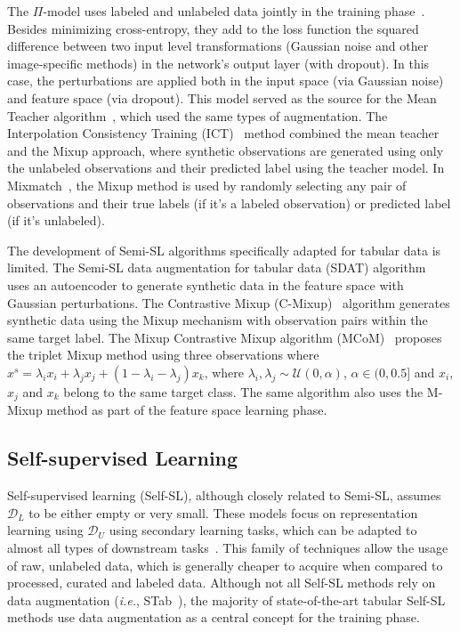\documentclass[parskip=full]{scrartcl}
\begin{document}
The $\Pi$-model uses labeled and unlabeled data jointly in the training
phase~\cite{samuli2017temporal}. Besides minimizing cross-entropy, they add to
the loss function the squared difference between two input level
transformations (Gaussian noise and other image-specific methods) in the
network's output layer (with dropout). In this case, the perturbations are
applied both in the input space (via Gaussian noise) and feature space (via
dropout). This model served as the source for the Mean Teacher
algorithm~\cite{tarvainen2017mean}, which used the same types of augmentation.
The Interpolation Consistency Training (ICT)~\cite{verma2022interpolation}
method combined the mean teacher and the Mixup approach, where synthetic
observations are generated using only the unlabeled observations and their
predicted label using the teacher model. In
Mixmatch~\cite{berthelot2019mixmatch}, the Mixup method is used by randomly
selecting any pair of observations and their true labels (if it's a labeled
observation) or predicted label (if it's unlabeled).

The development of Semi-SL algorithms specifically adapted for tabular data is
limited. The Semi-SL data augmentation for tabular data (SDAT)
algorithm~\cite{fang2022semi} uses an autoencoder to generate synthetic data
in the feature space with Gaussian perturbations. The Contrastive Mixup
(C-Mixup)~\cite{darabi2021contrastive} algorithm generates synthetic data
using the Mixup mechanism with observation pairs within the same target label.
The Mixup Contrastive Mixup algorithm (MCoM)~\cite{li2022mcom} proposes the triplet Mixup
method using three observations where $x^s = \lambda_ix_i + \lambda_jx_j +
(1-\lambda_i-\lambda_j)x_k$, where $\lambda_i, \lambda_j \sim \mathcal{U}(0,
\alpha)$, $\alpha \in (0, 0.5]$ and $x_i$, $x_j$ and $x_k$ belong to the same
target class. The same algorithm also uses the M-Mixup method as part of the
feature space learning phase.


\subsection{Self-supervised Learning}\label{sec:self-supervised-learning}

Self-supervised learning (Self-SL), although closely related to Semi-SL,
assumes $\mathcal{D}_L$ to be either empty or very small. These models focus
on representation learning using $\mathcal{D}_U$ using secondary learning
tasks, which can be adapted to almost all types of downstream
tasks~\cite{liu2021self}. This family of techniques allow the usage of raw,
unlabeled data, which is generally cheaper to acquire when compared to
processed, curated and labeled data. Although not all Self-SL methods rely on
data augmentation (\textit{i.e.}, STab~\cite{hajiramezanali2022stab}), the
majority of state-of-the-art tabular Self-SL methods use data augmentation as
a central concept for the training phase.
\end{document}

